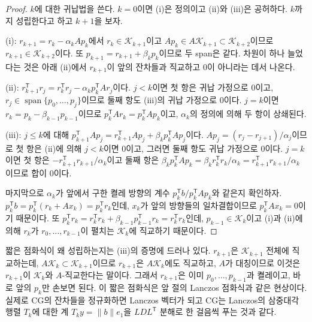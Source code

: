\begin{proof}
$k$에 대한 귀납법을 쓴다. $k=0$이면 (i)은 정의이고 (ii)와 (iii)은 공허하다. $k$까지 성립한다고 하고 $k+1$을 보자.

(i): $r_{k+1}=r_k-\alpha_kAp_k$에서 $r_k\in\mathcal K_{k+1}$이고 $Ap_k\in A\mathcal K_{k+1}\subset\mathcal K_{k+2}$이므로 $r_{k+1}\in\mathcal K_{k+2}$이다. 또 $p_{k+1}=r_{k+1}+\beta_kp_k$이므로 두 span은 같다. 차원이 하나 늘었다는 것은 아래 (ii)에서 $r_{k+1}$이 앞의 잔차들과 직교하고 $0$이 아니라는 데서 나온다.

(ii): $r_{k+1}^{\mathsf T}r_j=r_k^{\mathsf T}r_j-\alpha_kp_k^{\mathsf T}Ar_j$이다. $j<k$이면 첫 항은 귀납 가정으로 $0$이고, $r_j\in\operatorname{span}\{p_0,\dots,p_j\}$이므로 둘째 항도 (iii)의 귀납 가정으로 $0$이다. $j=k$이면 $r_k=p_k-\beta_{k-1}p_{k-1}$이므로 $p_k^{\mathsf T}Ar_k=p_k^{\mathsf T}Ap_k$이고, $\alpha_k$의 정의에 의해 두 항이 상쇄된다.

(iii): $j\le k$에 대해 $p_{k+1}^{\mathsf T}Ap_j=r_{k+1}^{\mathsf T}Ap_j+\beta_kp_k^{\mathsf T}Ap_j$이다. $Ap_j=(r_j-r_{j+1})/\alpha_j$이므로 첫 항은 (ii)에 의해 $j<k$이면 $0$이고, 그러면 둘째 항도 귀납 가정으로 $0$이다. $j=k$이면 첫 항은 $-r_{k+1}^{\mathsf T}r_{k+1}/\alpha_k$이고 둘째 항은 $\beta_kp_k^{\mathsf T}Ap_k=\beta_kr_k^{\mathsf T}r_k/\alpha_k=r_{k+1}^{\mathsf T}r_{k+1}/\alpha_k$이므로 합이 $0$이다.

마지막으로 $\alpha_k$가 앞에서 구한 켤레 방향의 계수 $p_k^{\mathsf T}b/p_k^{\mathsf T}Ap_k$와 같은지 확인하자. $p_k^{\mathsf T}b=p_k^{\mathsf T}(r_k+Ax_k)=p_k^{\mathsf T}r_k$인데, $x_k$가 앞의 방향들의 일차결합이므로 $p_k^{\mathsf T}Ax_k=0$이기 때문이다. 또 $p_k^{\mathsf T}r_k=r_k^{\mathsf T}r_k+\beta_{k-1}p_{k-1}^{\mathsf T}r_k=r_k^{\mathsf T}r_k$인데, $p_{k-1}\in\mathcal K_k$이고 (i)과 (ii)에 의해 $r_k$가 $r_0,\dots,r_{k-1}$이 펼치는 $\mathcal K_k$에 직교하기 때문이다.
\end{proof}

짧은 점화식이 왜 성립하는지는 (iii)의 증명에 드러나 있다. $r_{k+1}$은 $\mathcal K_{k+1}$ 전체에 직교하는데, $A\mathcal K_k\subset\mathcal K_{k+1}$이므로 $r_{k+1}$은 $A\mathcal K_k$에도 직교하고, $A$가 대칭이므로 이것은 $r_{k+1}$이 $\mathcal K_k$와 $A$-직교한다는 말이다. 그래서 $r_{k+1}$은 이미 $p_0,\dots,p_{k-1}$과 켤레이고, 바로 앞의 $p_k$만 손보면 된다. 이 짧은 점화식은 앞 절의 Lanczos 점화식과 같은 현상이다. 실제로 CG의 잔차들을 정규화하면 Lanczos 벡터가 되고 CG는 Lanczos의 삼중대각 행렬 $T_k$에 대한 계 $T_ky=\|b\|e_1$을 $LDL^{\mathsf T}$ 분해로 한 걸음씩 푸는 것과 같다\cite{golub1989history}.

